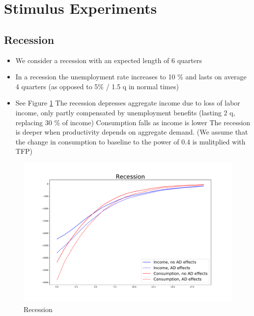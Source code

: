 \documentclass[]{article}
\begin{document}
\section{Stimulus Experiments}

\subsection{Recession}

\begin{itemize}
	\item We consider a recession with an expected length of 6 quarters
	\item In a recession the unemployment rate increases to 10 \% and lasts on average 4 quarters (as opposed to 5\% / 1.5 q in normal times)
	\item See Figure \ref{fig:recession}
	\subitem The recession depresses aggregate income due to loss of labor income, only partly compensated by unemployment benefits (lasting 2 q, replacing 30 \% of income)
	\subitem Consumption falls as income is lower
	\subitem The recession is deeper when productivity depends on aggregate demand. (We assume that the change in consumption to baseline to the power of 0.4 is mulitplied with TFP)
	
\end{itemize}


\begin{figure} 
	\begin{centering}
		\includegraphics[width=\linewidth]{../recession.pdf}
		\caption{Recession}
		\label{fig:recession}
	\end{centering}
\end{figure}
\end{document}
